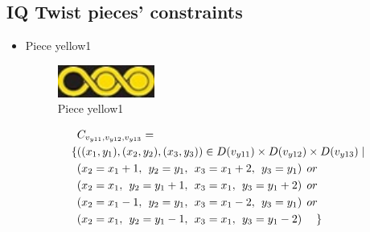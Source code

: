 \begin{appendices}
\renewcommand\thechapter{}
\renewcommand\thesection{\arabic{section}}
\renewcommand\thesubsection{\thesection.\arabic{subsection}}
\renewcommand\thefigure{\arabic{figure}}
\renewcommand\thetable{\arabic{table}}
\section{IQ Twist pieces' constraints}
\label{appendix:2Dpieces}
\begin{itemize}
  \item Piece yellow1\\
\begin{figure}[H]
    \centering
    \includegraphics[width=0.3\textwidth]{figs/yellow1.jpg}
    \caption{Piece yellow1}
\end{figure}
  \begin{align*}
&C_{v_{y11},v_{y12},v_{y13}}=\\
\{&((x_{1},y_{1}),(x_{2},y_{2}),(x_{3},y_{3}))\in D(v_{y11})\times D(v_{y12})\times D(v_{y13})\mid\\
&(x_{2} = x_{1} + 1,\hspace{1ex}y_{2} = y_{1},\hspace{1ex}x_{3} = x_{1} + 2, \hspace{1ex}y_{3} = y_{1})\hspace{1ex} or\\
&(x_{2} = x_{1},\hspace{1ex}y_{2} = y_{1}+1,\hspace{1ex}x_{3} = x_{1}, \hspace{1ex}y_{3} = y_{1}+2)\hspace{1ex} or\\
&(x_{2} = x_{1}-1,\hspace{1ex}y_{2} = y_{1},\hspace{1ex}x_{3} = x_{1}-2,\hspace{1ex} y_{3} = y_{1})\hspace{1ex} or\\
&(x_{2} = x_{1},\hspace{1ex}y_{2} = y_{1}-1,\hspace{1ex}x_{3} = x_{1}, \hspace{1ex}y_{3} = y_{1}-2)\hspace{3ex} \}
\end{align*} 

\end{itemize}
\end{appendices}
